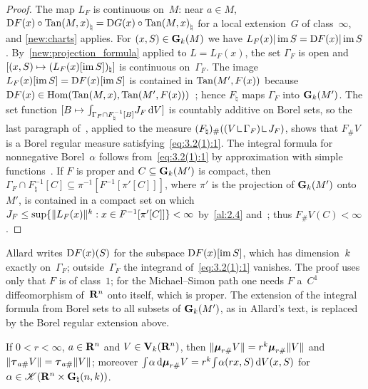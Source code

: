 \begin{proof}
    The map $L_F$ is continuous on~$M$: near $a \in M$, $\mathrm{D} F(x) \circ {\operatorname{Tan}(M,x)}_\natural =
    \mathrm{D} G(x) \circ {\operatorname{Tan}(M,x)}_\natural$ for a local extension~$G$ of class~$\infty$, and
    \ref{new:charts} applies. For $(x,S) \in \mathbf{G}_{k}(M)$ we have $L_F(x) | \operatorname{im} S = \mathrm{D} F(x) | \operatorname{im}
    S$. By~\ref{new:projection_formula} applied to $L = L_F(x)$, the set $\Gamma_F$ is open and
    $[(x,S) \mapsto (L_F(x)[\operatorname{im} S])_\natural]$ is continuous on~$\Gamma_F$. The image
    $L_F(x)[\operatorname{im} S] = \mathrm{D} F(x)[\operatorname{im} S]$ is contained in $\operatorname{Tan}(M',F(x))$ because $\mathrm{D} F(x) \in
    \operatorname{Hom}(\operatorname{Tan}(M,x),\operatorname{Tan}(M',F(x)))$~\cite[3.1.21]{Federer1969}; hence $F_\natural$ maps
    $\Gamma_F$ into $\mathbf{G}_{k}(M')$. The set function $[ B \mapsto {\textstyle\int_{\Gamma_F \cap
    F_\natural^{-1}[B]}^{}} J_F \,\mathrm{d} V ]$ is countably additive on Borel sets, so the last paragraph
    of~\cite[2.2.3]{Federer1969}, applied to the measure $(F_\natural)_\# ((V \restrict \Gamma_F)
    \restrict J_F)$, shows that $F_\# V$ is a Borel regular measure satisfying~\eqref{eq:3.2(1):1}.
    The integral formula for nonnegative Borel~$\alpha$ follows from~\eqref{eq:3.2(1):1} by
    approximation with simple functions~\cite[2.3.3, 2.4.7]{Federer1969}. If $F$ is proper and $C
    \subseteq \mathbf{G}_{k}(M')$ is compact, then $\Gamma_F \cap F_\natural^{-1}[C] \subseteq
    \pi^{-1}[F^{-1}[\pi'[C]]]$, where $\pi'$ is the projection of $\mathbf{G}_{k}(M')$ onto~$M'$, is
    contained in a compact set on which $J_F \le \sup \{ \|L_F(x)\|^{k} : x \in
    F^{-1}[\pi'[C]] \} < \infty$ by~\ref{al:2.4} and~\cite[1.7.6]{Federer1969}; thus $F_\# V(C) <
    \infty$.
\end{proof}

\begin{remark}
    \label{rem:3.2}
    Allard writes $\mathrm{D} F(x)(S)$ for the subspace $\mathrm{D} F(x)[\operatorname{im} S]$, which has dimension~$k$
    exactly on~$\Gamma_F$; outside~$\Gamma_F$ the integrand of~\eqref{eq:3.2(1):1} vanishes. The
    proof uses only that $F$ is of class~$1$; for the Michael--Simon path one needs $F$ a~$C^1$
    diffeomorphism of~$\mathbf{R}^{n}$ onto itself, which is proper. The extension of the integral
    formula from Borel sets to all subsets of $\mathbf{G}_{k}(M')$, as in Allard's text, is replaced by the
    Borel regular extension above.
\end{remark}

\begin{lemma}
    \label{al:3.2(2)}
    If $0 < r < \infty$, $a \in \mathbf{R}^{n}$ and $V \in \mathbf{V}_{k}(\mathbf{R}^{n})$, then
    $\|\boldsymbol{\mu}_{r \#} V\| = r^{k} \boldsymbol{\mu}_{r \#} \|V\|$ and $\|\boldsymbol{\tau}_{a \#} V\| = \boldsymbol{\tau}_{a \#}
    \|V\|$; moreover ${\textstyle\int_{}^{}} \alpha \,\mathrm{d} \boldsymbol{\mu}_{r \#} V = r^{k} {\textstyle\int_{}^{}} \alpha(r x, S)
    \,\mathrm{d} V(x,S)$ for $\alpha \in \mathscr{K}(\mathbf{R}^{n} \times \mathbf{G}_{\natural}(n,k))$.
\end{lemma}

